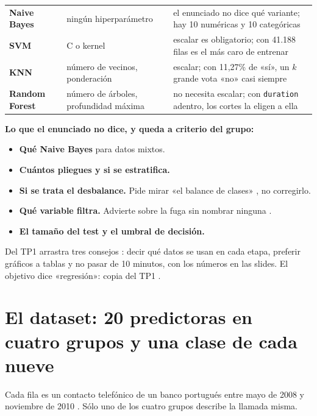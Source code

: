 \documentclass[10pt,a4paper]{article}
\begin{document}
\begin{tabularx}{\linewidth}{@{}P{2.4cm}P{4.2cm}L@{}}
\toprule
{} &  &  \\
\midrule
\textbf{Naive Bayes} & ningún hiperparámetro  & el enunciado no dice qué variante; hay 10 numéricas y 10 categóricas  \\
\textbf{SVM} & C o kernel  & escalar es obligatorio; con 41.188 filas es el más caro de entrenar  \\
\textbf{KNN} & número de vecinos, ponderación  & escalar; con 11,27\% de «sí», un $k$ grande vota «no» casi siempre  \\
\textbf{Random Forest} & número de árboles, profundidad máxima  & no necesita escalar; con \texttt{duration} adentro, los cortes la eligen a ella  \\
\bottomrule
\end{tabularx}
\medskip

\textbf{Lo que el enunciado no dice, y queda a criterio del grupo:}
\begin{itemize}
\item \textbf{Qué Naive Bayes} para datos mixtos.
\item \textbf{Cuántos pliegues y si se estratifica.}
\item \textbf{Si se trata el desbalance.} Pide mirar «el balance de clases» , no corregirlo.
\item \textbf{Qué variable filtra.} Advierte sobre la fuga sin nombrar ninguna .
\item \textbf{El tamaño del test y el umbral de decisión.}
\end{itemize}
Del TP1 arrastra tres consejos : decir qué datos se usan en cada etapa, preferir
gráficos a tablas y no pasar de 10 minutos, con los números en las slides. El objetivo dice
«regresión»: copia del TP1 .

\newpage
\section{El dataset: 20 predictoras en cuatro grupos y una clase de cada nueve}\label{sec:dataset}

Cada fila es un contacto telefónico de un banco portugués entre mayo de 2008 y noviembre de 2010
. Sólo uno de los cuatro grupos describe la llamada misma.
\end{document}
